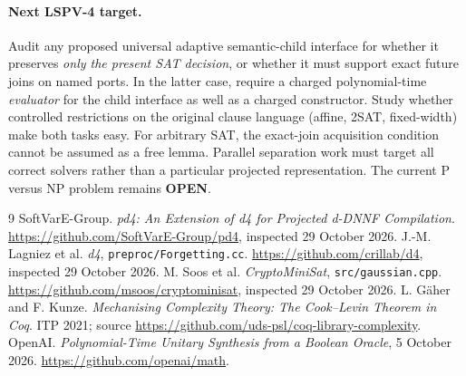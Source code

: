 \documentclass[11pt]{article}
\begin{document}
\paragraph{Next LSPV-4 target.} Audit any proposed universal adaptive semantic-child interface for whether it preserves \emph{only the present SAT decision}, or whether it must support exact future joins on named ports. In the latter case, require a charged polynomial-time \emph{evaluator} for the child interface as well as a charged constructor. Study whether controlled restrictions on the original clause language (affine, 2SAT, fixed-width) make both tasks easy. For arbitrary SAT, the exact-join acquisition condition cannot be assumed as a free lemma. Parallel separation work must target all correct solvers rather than a particular projected representation. The current P versus NP problem remains \textbf{OPEN}.


\begin{thebibliography}{9}
 SoftVarE-Group. \emph{pd4: An Extension of d4 for Projected d-DNNF Compilation}. \url{https://github.com/SoftVarE-Group/pd4}, inspected 29 October 2026.
 J.-M. Lagniez et al. \emph{d4}, \texttt{preproc/Forgetting.cc}. \url{https://github.com/crillab/d4}, inspected 29 October 2026.
 M. Soos et al. \emph{CryptoMiniSat}, \texttt{src/gaussian.cpp}. \url{https://github.com/msoos/cryptominisat}, inspected 29 October 2026.
 L. G\"aher and F. Kunze. \emph{Mechanising Complexity Theory: The Cook--Levin Theorem in Coq}. ITP 2021; source \url{https://github.com/uds-psl/coq-library-complexity}.
 OpenAI. \emph{Polynomial-Time Unitary Synthesis from a Boolean Oracle}, 5 October 2026. \url{https://github.com/openai/math}.
\end{thebibliography}
\end{document}
